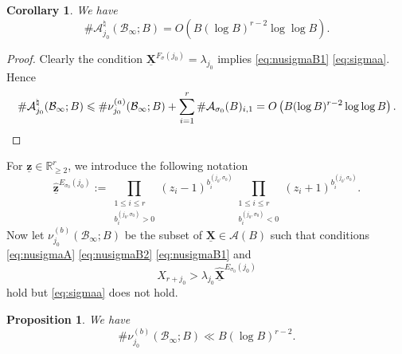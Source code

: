 \documentclass[11pt,letterpaper]{amsart}
\newcommand{\BR}{{\mathbb {R}}}
\newcommand{\CA}{{\mathcal {A}}}
\newcommand{\CB}{{\mathcal {B}}}
\newcommand{\XX}{\underline{\mathbf{X}}}
\newcommand{\zz}{\underline{\mathbf{z}}}
\theoremstyle{plain}
\numberwithin{equation}{section}
\newtheorem{proposition}[theorem]{Proposition}
\newtheorem{corollary}[theorem]{Corollary}
\theoremstyle{definition}
\theoremstyle{remark}
\begin{document}
\begin{corollary}\label{co:partialCsigma}
	We have
	$$\#\CA_{j_0}^{\natural}(\CB_\infty;B)=O\left(B(\log B)^{r-2}\log\log B\right).$$
\end{corollary}
\begin{proof}
Clearly the condition $\XX^{F_\sigma(j_0)}=\lambda_{j_0}$ implies  \eqref{eq:nusigmaB1} \eqref{eq:sigmaa}. Hence
\begin{equation*}
	\#\CA_{j_0}^{\natural}(\CB_\infty;B)\leqslant \#\nu_{j_0}^{(a)}(\CB_\infty;B)+ \sum_{i=1}^{r}\#\CA_{\sigma_0}(B)_{i,1}=O\left(B(\log B)^{r-2}\log\log B\right).\qedhere
\end{equation*}
\end{proof}

For $\zz\in\BR_{\geqslant 2}^r$, we introduce the following notation \begin{equation}\label{eq:zzhat}
	\widehat{\zz}^{E_{\sigma_0}(j_0)}:=\prod_{\substack{1\leqslant i\leqslant r\\b_{i}^{(j_0,\sigma_0)}>0}}\left(z_i-1\right)^{b_{i}^{(j_0,\sigma_0)}}\prod_{\substack{1\leqslant i\leqslant r\\b_i^{(j_0,\sigma_0)}<0}}\left(z_i+1\right)^{b_{i}^{(j_0,\sigma_0)}}.
\end{equation}
Now let $\nu_{j_0}^{(b)}(\CB_\infty;B)$ be the subset of $\XX\in \CA(B)$ such that conditions \eqref{eq:nusigmaA} \eqref{eq:nusigmaB2} \eqref{eq:nusigmaB1} and
\begin{equation}\label{eq:sigmabb}
	X_{r+j_0}>\lambda_{j_0}\widehat{\XX}^{E_{\sigma_0}(j_0)}
\end{equation} hold but \eqref{eq:sigmaa} does not hold.
\begin{proposition}\label{prop:nusigmab}
	We have
	$$\#\nu_{j_0}^{(b)}(\CB_\infty;B)\ll B(\log B)^{r-2}.$$
\end{proposition}
\end{document}
